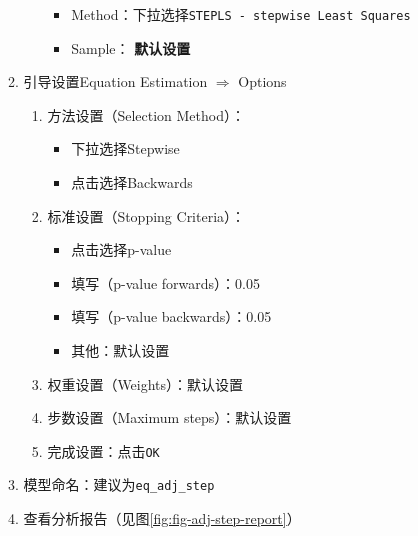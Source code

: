 \documentclass[12pt,(landscape,a4paper),(portrait,a4paper)]{article}
\providecommand{\tightlist}{%
  \setlength{\itemsep}{0pt}\setlength{\parskip}{0pt}}
\begin{document}
\begin{itemize}
\begin{enumerate}
\begin{enumerate}
      \begin{itemize}
      \tightlist
      \item
        Method：下拉选择\texttt{STEPLS\ -\ stepwise\ Least\ Squares}
      \item
        Sample： \textbf{默认设置}
      \end{itemize}
    \end{enumerate}
  \item
    引导设置Equation Estimation \(\Rightarrow\) Options

    \begin{enumerate}
    \def\labelenumii{\alph{enumii}.}
    \tightlist
    \item
      方法设置（Selection Method）：

      \begin{itemize}
      \tightlist
      \item
        下拉选择Stepwise
      \item
        点击选择Backwards
      \end{itemize}
    \item
      标准设置（Stopping Criteria）：

      \begin{itemize}
      \tightlist
      \item
        点击选择p-value
      \item
        填写（p-value forwards）：0.05
      \item
        填写（p-value backwards）：0.05
      \item
        其他：默认设置
      \end{itemize}
    \item
      权重设置（Weights）：默认设置
    \item
      步数设置（Maximum steps）：默认设置
    \item
      完成设置：点击\texttt{OK}\\
    \end{enumerate}
  \item
    模型命名：建议为\texttt{eq\_adj\_step}\\
  \item
    查看分析报告（见图\ref{fig:fig-adj-step-report}）
  \end{enumerate}
\end{itemize}
\end{document}
